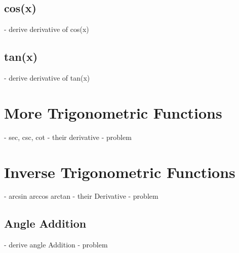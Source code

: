 \subsection{cos(x)}
- derive derivative of cos(x)
\subsection{tan(x)}
- derive derivative of tan(x)
\section{More Trigonometric Functions}
- sec, csc, cot
- their derivative 
- problem
\section{Inverse Trigonometric Functions}
- arcsin arccos arctan
- their Derivative
- problem

\begin{subappendices}
    \section{Angle Addition}
    - derive angle Addition
    - problem
\end{subappendices}